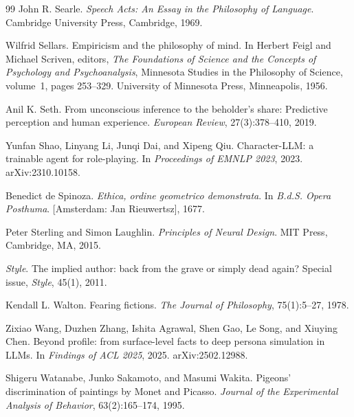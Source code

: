 \documentclass[11pt,a4paper]{article}
\theoremstyle{remark}\newtheorem{remark}[definition]{Remark}
\begin{document}
\begin{thebibliography}{99}
John R. Searle.
\newblock \emph{Speech Acts: An Essay in the Philosophy of Language}.
\newblock Cambridge University Press, Cambridge, 1969.

Wilfrid Sellars.
\newblock Empiricism and the philosophy of mind.
\newblock In Herbert Feigl and Michael Scriven, editors, \emph{The Foundations of Science and the Concepts of Psychology and Psychoanalysis}, Minnesota Studies in the Philosophy of Science, volume~1, pages 253--329. University of Minnesota Press, Minneapolis, 1956.

Anil K. Seth.
\newblock From unconscious inference to the beholder's share: Predictive perception and human experience.
\newblock \emph{European Review}, 27(3):378--410, 2019.

Yunfan Shao, Linyang Li, Junqi Dai, and Xipeng Qiu.
\newblock Character-LLM: a trainable agent for role-playing.
\newblock In \emph{Proceedings of EMNLP 2023}, 2023. arXiv:2310.10158.

Benedict de Spinoza.
\newblock \emph{Ethica, ordine geometrico demonstrata}.
\newblock In \emph{B.d.S. Opera Posthuma}. [Amsterdam: Jan Rieuwertsz], 1677.

Peter Sterling and Simon Laughlin.
\newblock \emph{Principles of Neural Design}.
\newblock MIT Press, Cambridge, MA, 2015.

\emph{Style}.
\newblock The implied author: back from the grave or simply dead again?
\newblock Special issue, \emph{Style}, 45(1), 2011.

Kendall L. Walton.
\newblock Fearing fictions.
\newblock \emph{The Journal of Philosophy}, 75(1):5--27, 1978.

Zixiao Wang, Duzhen Zhang, Ishita Agrawal, Shen Gao, Le Song, and Xiuying Chen.
\newblock Beyond profile: from surface-level facts to deep persona simulation in LLMs.
\newblock In \emph{Findings of ACL 2025}, 2025. arXiv:2502.12988.

Shigeru Watanabe, Junko Sakamoto, and Masumi Wakita.
\newblock Pigeons' discrimination of paintings by Monet and Picasso.
\newblock \emph{Journal of the Experimental Analysis of Behavior}, 63(2):165--174, 1995.


\end{thebibliography}
\end{document}
